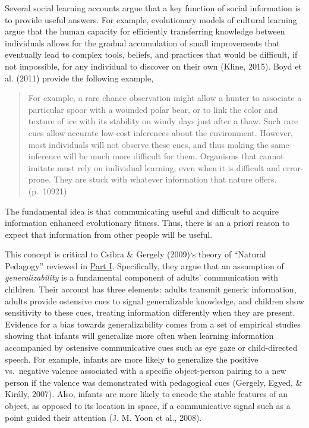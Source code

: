 \documentclass[oneside]{report}
\begin{document}
Several social learning accounts argue that a key function of social
information is to provide useful answers. For example, evolutionary
models of cultural learning argue that the human capacity for
efficiently transferring knowledge between individuals allows for the
gradual accumulation of small improvements that eventually lead to
complex tools, beliefs, and practices that would be difficult, if not
impossible, for any individual to discover on their own (Kline, 2015).
Boyd et al. (2011) provide the following example,
\begin{quote}
For example, a rare chance observation might allow a hunter to associate
a particular spoor with a wounded polar bear, or to link the color and
texture of ice with its stability on windy days just after a thaw. Such
rare cues allow accurate low-cost inferences about the environment.
However, most individuals will not observe these cues, and thus making
the same inference will be much more difficult for them. Organisms that
cannot imitate must rely on individual learning, even when it is
difficult and error-prone. They are stuck with whatever information that
nature offers. (p.~10921)
\end{quote}
\noindent
The fundamental idea is that communicating useful and difficult to
acquire information enhanced evolutionary fitness. Thus, there is an a
priori reason to expect that information from other people will be
useful.

This concept is critical to Csibra \& Gergely (2009)`s theory of
``Natural Pedagogy'' reviewed in \protect\hyperlink{p1}{Part I}.
Specifically, they argue that an assumption of \emph{generalizability}
is a fundamental component of adults' communication with children. Their
account has three elements: adults transmit generic information, adults
provide ostensive cues to signal generalizable knowledge, and children
show sensitivity to these cues, treating information differently when
they are present. Evidence for a bias towards generalizability comes
from a set of empirical studies showing that infants will generalize
more often when learning information accompanied by ostensive
communicative cues such as eye gaze or child-directed speech. For
example, infants are more likely to generalize the positive vs.~negative
valence associated with a specific object-person pairing to a new person
if the valence was demonstrated with pedagogical cues (Gergely, Egyed,
\& Király, 2007). Also, infants are more likely to encode the stable
features of an object, as opposed to its location in space, if a
communicative signal such as a point guided their attention (J. M. Yoon
et al., 2008).
\end{document}
